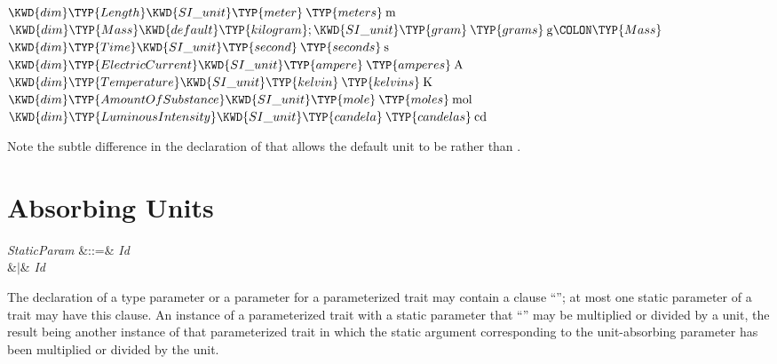 \begin{Fortress}
\(\KWD{dim} \TYP{Length}  \KWD{SI{\char'137}unit} \TYP{meter}\mskip 4mu plus 4mu\TYP{meters}\mskip 4mu plus 4mu\mathrm{m} \)\\
\(\KWD{dim} \TYP{Mass} \KWD{default} \TYP{kilogram}; \KWD{SI{\char'137}unit} \TYP{gram}\mskip 4mu plus 4mu\TYP{grams}\mskip 4mu plus 4mu\mathrm{g}\COLON \TYP{Mass}\)\\
\(\KWD{dim} \TYP{Time}  \KWD{SI{\char'137}unit} \TYP{second}\mskip 4mu plus 4mu\TYP{seconds}\mskip 4mu plus 4mu\mathrm{s}\)\\
\(\KWD{dim} \TYP{ElectricCurrent}  \KWD{SI{\char'137}unit} \TYP{ampere}\mskip 4mu plus 4mu\TYP{amperes}\mskip 4mu plus 4mu\mathrm{A}\)\\
\(\KWD{dim} \TYP{Temperature}  \KWD{SI{\char'137}unit} \TYP{kelvin}\mskip 4mu plus 4mu\TYP{kelvins}\mskip 4mu plus 4mu\mathrm{K}\)\\
\(\KWD{dim} \TYP{AmountOfSubstance}  \KWD{SI{\char'137}unit} \TYP{mole}\mskip 4mu plus 4mu\TYP{moles}\mskip 4mu plus 4mu\mathrm{mol}\)\\
\(\KWD{dim} \TYP{LuminousIntensity}  \KWD{SI{\char'137}unit} \TYP{candela}\mskip 4mu plus 4mu\TYP{candelas}\mskip 4mu plus 4mu\mathrm{cd}\)
\end{Fortress}
Note the subtle difference in the declaration of  that
allows the default unit to be  rather than .


\section{Absorbing Units}

\begin{Grammar}
\emph{StaticParam}
&::=& \emph{Id}   \\
&$|$&  \emph{Id} 
 \\
\end{Grammar}

The declaration of a type parameter or a  parameter for
a parameterized trait may contain a clause
``''; at
most one static parameter of a trait may have this clause.  An
instance of a parameterized trait
with a static parameter that ``'' may
be multiplied
or divided by a unit, the result being another instance of that
parameterized trait in which the static argument corresponding to
the unit-absorbing parameter has been multiplied or divided by the unit.

